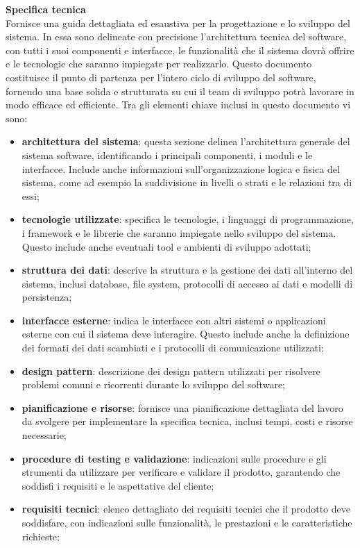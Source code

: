 \textbf{Specifica tecnica}\\
Fornisce una guida dettagliata ed esaustiva per la progettazione e lo sviluppo del sistema. In essa sono delineate con precisione l'architettura tecnica del software, con tutti i suoi componenti e interfacce, le funzionalità che il sistema dovrà offrire e le tecnologie che saranno impiegate per realizzarlo. Questo documento costituisce il punto di partenza per l'intero ciclo di sviluppo del software, fornendo una base solida e strutturata su cui il team di sviluppo potrà lavorare in modo efficace ed efficiente. Tra gli elementi chiave inclusi in questo documento vi sono:
\begin{itemize}
	\item \textbf{architettura del sistema}: questa sezione delinea l'architettura generale del sistema software, identificando i principali componenti, i moduli e le interfacce. Include anche informazioni sull'organizzazione logica e fisica del sistema, come ad esempio la suddivisione in livelli o strati e le relazioni tra di essi;
	\item \textbf{tecnologie utilizzate}: specifica le tecnologie, i linguaggi di programmazione, i framework e le librerie che saranno impiegate nello sviluppo del sistema. Questo include anche eventuali tool e ambienti di sviluppo adottati;
	\item \textbf{struttura dei dati}: descrive la struttura e la gestione dei dati all'interno del sistema, inclusi database, file system, protocolli di accesso ai dati e modelli di persistenza;
	\item \textbf{interfacce esterne}: indica le interfacce con altri sistemi o applicazioni esterne con cui il sistema deve interagire. Questo include anche la definizione dei formati dei dati scambiati e i protocolli di comunicazione utilizzati;
	\item \textbf{design pattern}: descrizione dei design pattern utilizzati per risolvere problemi comuni e ricorrenti durante lo sviluppo del software;
	\item \textbf{pianificazione e risorse}: fornisce una pianificazione dettagliata del lavoro da svolgere per implementare la specifica tecnica, inclusi tempi, costi e risorse necessarie;
	\item \textbf{procedure di testing e validazione}: indicazioni sulle procedure e gli strumenti da utilizzare per verificare e validare il prodotto, garantendo che soddisfi i requisiti e le aspettative del cliente;
	\item \textbf{requisiti tecnici}: elenco dettagliato dei requisiti tecnici che il prodotto deve soddisfare, con indicazioni sulle funzionalità, le prestazioni e le caratteristiche richieste;
\end{itemize}

